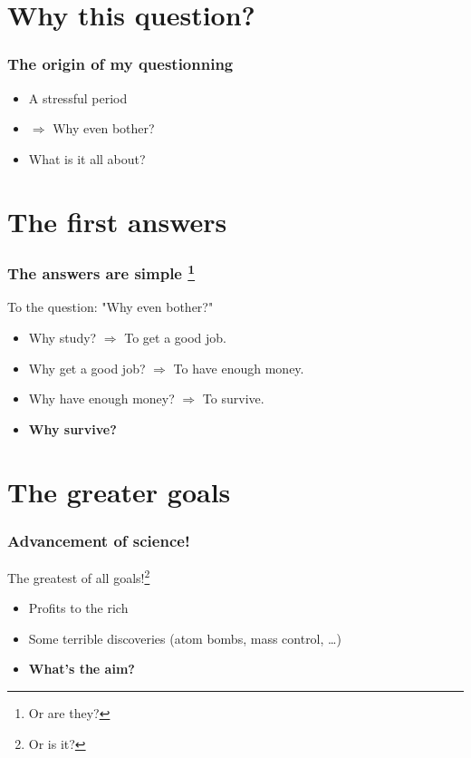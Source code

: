 \documentclass{beamer}
\begin{document}
    
    \section{Why this question?}
    \begin{frame}
    		\frametitle{The origin of my questionning}
    		
    		\begin{itemize}[<+->]
    			\item A stressful period
    			\item $\Rightarrow$ Why even bother? 
    			\item What is it all about?
    		\end{itemize}
    \end{frame}
    
    
    \section{The first answers}
    
    \begin{frame}
    	\frametitle{The answers are simple \footnote{Or are they?}}
    	
		To the question: "Why even bother?" \pause    		
		\begin{itemize}[<+->]
			\item Why study? $\Rightarrow$ To get a good job.
			\item Why get a good job? $\Rightarrow$ To have enough money.
			\item Why have enough money? $\Rightarrow$ To survive.
			\item \textbf{Why survive?}
		\end{itemize}		    		
    \end{frame}
    
	\section{The greater goals}    
    
    \begin{frame}
    		\frametitle{Advancement of science!}
    		
    		The greatest of all goals!\footnote{Or is it?} \pause
    		\begin{itemize}[<+->]
    			\item Profits to the rich
    			\item Some terrible discoveries (atom bombs, mass control, \dots)
    			\item \textbf{What's the aim?}
    		\end{itemize}
    \end{frame}
    
\end{document}
